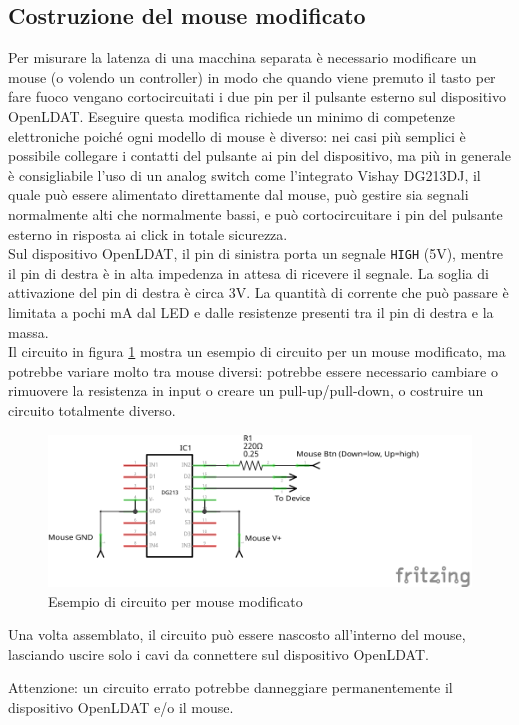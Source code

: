 \subsection{Costruzione del mouse modificato}
Per misurare la latenza di una macchina separata è necessario modificare un mouse (o volendo un controller) in modo che quando viene premuto il tasto per fare fuoco vengano cortocircuitati i due pin per il pulsante esterno sul dispositivo OpenLDAT. Eseguire questa modifica richiede un minimo di competenze elettroniche poiché ogni modello di mouse è diverso: nei casi più semplici è possibile collegare i contatti del pulsante ai pin del dispositivo, ma più in generale è consigliabile l'uso di un analog switch come l'integrato Vishay DG213DJ\cite{vishay_dg213_datasheet}, il quale può essere alimentato direttamente dal mouse, può gestire sia segnali normalmente alti che normalmente bassi, e può cortocircuitare i pin del pulsante esterno in risposta ai click in totale sicurezza.\\
Sul dispositivo OpenLDAT, il pin di sinistra porta un segnale \texttt{HIGH} (5V), mentre il pin di destra è in alta impedenza in attesa di ricevere il segnale. La soglia di attivazione del pin di destra è circa 3V\cite{atmega32u4_datasheet}. La quantità di corrente che può passare è limitata a pochi mA dal LED e dalle resistenze presenti tra il pin di destra e la massa.\\
Il circuito in figura \ref{fig:modmouse_example} mostra un esempio di circuito per un mouse modificato, ma potrebbe variare molto tra mouse diversi: potrebbe essere necessario cambiare o rimuovere la resistenza in input o creare un pull-up/pull-down, o costruire un circuito totalmente diverso.

\begin{figure}[h!]
	\centering
	\includegraphics[width=\textwidth]{Chapter03/res/modmouse_example.png}
	\caption{Esempio di circuito per mouse modificato}
	\label{fig:modmouse_example}
\end{figure}

Una volta assemblato, il circuito può essere nascosto all'interno del mouse, lasciando uscire solo i cavi da connettere sul dispositivo OpenLDAT.

Attenzione: un circuito errato potrebbe danneggiare permanentemente il dispositivo OpenLDAT e/o il mouse.
